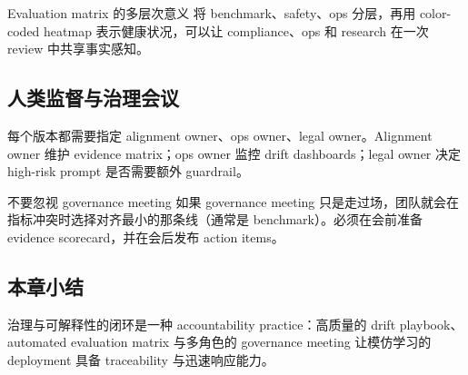\begin{importantbox}{Evaluation matrix 的多层次意义}
将 benchmark、safety、ops 分层，再用 color-coded heatmap 表示健康状况，可以让 compliance、ops 和 research 在一次 review 中共享事实感知。
\end{importantbox}

\subsection{人类监督与治理会议}

每个版本都需要指定 alignment owner、ops owner、legal owner。Alignment owner 维护 evidence matrix；ops owner 监控 drift dashboards；legal owner 决定 high-risk prompt 是否需要额外 guardrail。

\begin{warningbox}{不要忽视 governance meeting}
如果 governance meeting 只是走过场，团队就会在指标冲突时选择对齐最小的那条线（通常是 benchmark）。必须在会前准备 evidence scorecard，并在会后发布 action items。
\end{warningbox}

\subsection{本章小结}

治理与可解释性的闭环是一种 accountability practice：高质量的 drift playbook、automated evaluation matrix 与多角色的 governance meeting 让模仿学习的 deployment 具备 traceability 与迅速响应能力。

